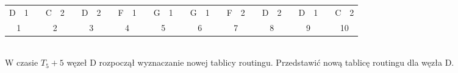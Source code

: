 \begin{tabular}{|c|c|c|c|c|c|c|c|c|c|c|c|c|c|c|c|c|c|c|c|c|c|c|c|c|c|c|c|c|}
				D          & 1          &  & C           & 2         &  & D          & 2         &  & F           & 1         &  & G           & 1         &  & G           & 1         &  & F           & 2         &  & D           & 2         &  & D           & 1         &  & C          & 2         \\ \cline{1-2} \cline{4-5} \cline{7-8} \cline{10-11} \cline{13-14} \cline{16-17} \cline{19-20} \cline{22-23} \cline{25-26} \cline{28-29}
				\multicolumn{2}{c}{1} &  & \multicolumn{2}{c}{2} &  & \multicolumn{2}{c}{3} &  & \multicolumn{2}{c}{4} &  & \multicolumn{2}{c}{5} &  & \multicolumn{2}{c}{6} &  & \multicolumn{2}{c}{7} &  & \multicolumn{2}{c}{8} &  & \multicolumn{2}{c}{9} &  & \multicolumn{2}{c}{10} \\ 
			\end{tabular}\\
			W czasie $ T_5+5 $ węzeł D rozpoczął wyznaczanie nowej tablicy routingu. Przedstawić nową tablicę routingu dla węzła D.
